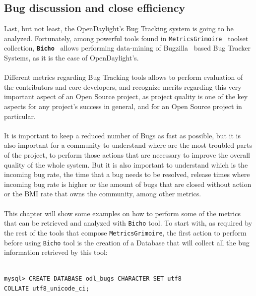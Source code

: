 \documentclass[a4paper, 12pt]{book}
\begin{document}
\subsection{Bug discussion and close efficiency}
Last, but not least, the OpenDaylight's Bug Tracking system is going to be analyzed. Fortunately, among powerful tools found in \texttt{MetricsGrimoire}~\cite{MetricsGrimoire} toolset collection, \textbf{\texttt{Bicho}}~\cite{Bicho} allows performing data-mining of Bugzilla~\cite{Bugzilla} based Bug Tracker Systems, as it is the case of OpenDaylight's.\\
\\
Different metrics regarding Bug Tracking tools allows to perform evaluation of the contributors and core developers, and recognize merits regarding this very important aspect of an Open Source project, as project quality is one of the key aspects for any project's success in general, and for an Open Source project in particular.\\
\\
It is important to keep a reduced number of Bugs as fast as possible, but it is also important for a community to understand where are the most troubled parts of the project, to perform those actions that are necessary to improve the overall quality of the whole system. But it is also important to understand which is the incoming bug rate, the time that a bug needs to be resolved, release times where incoming bug rate is higher or the amount of bugs that are closed without action or the BMI rate that owns the community, among other metrics.\\
\\
This chapter will show some examples on how to perform some of the metrics that can be retrieved and analyzed with \texttt{Bicho} tool. To start with, as required by the rest of the tools that compose \texttt{MetricsGrimoire}, the first action to perform before using \texttt{Bicho} tool is the creation of a Database that will collect all the bug information retrieved by this tool:
\begin{verbatim}

mysql> CREATE DATABASE odl_bugs CHARACTER SET utf8
COLLATE utf8_unicode_ci;

\end{verbatim}
\end{document}
